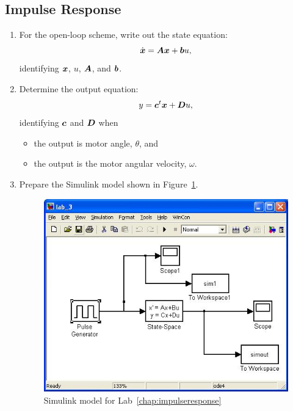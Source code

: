\subsection{Impulse Response}\label{cha:impulseRes}

\begin{enumerate}
    \item For the open-loop scheme, write out the state equation:
          \begin{equation*}
              \dot{\boldsymbol{x}}=\boldsymbol{A}\boldsymbol{x}+\boldsymbol{b}u,
          \end{equation*}
          identifying \(\boldsymbol{x}\), \(u\), \(\boldsymbol{A}\), and \(\boldsymbol{b}\).

    \item Determine the output equation:
          \begin{equation}
              y=\boldsymbol{c}^{t}\boldsymbol{x}+\boldsymbol{D}u,
          \end{equation}
          identifying \(\boldsymbol{c}\) and \(\boldsymbol{D}\) when
          \begin{itemize}
              \item the output is motor angle, \(\theta \), and
              \item the output is the motor angular velocity, \(\omega \).
          \end{itemize}

    \item Prepare the \textsf{Simulink} model shown in Figure~\ref{fig:model3}.
          \begin{figure}[htbp]
              \centering
              \includegraphics[width=0.6\hsize]{pix/impulseResponseModel.jpg}
              \caption{\textsf{Simulink} model for Lab~\ref{chap:impulseresponse}}\label{fig:model3}
          \end{figure}%


\end{enumerate}
